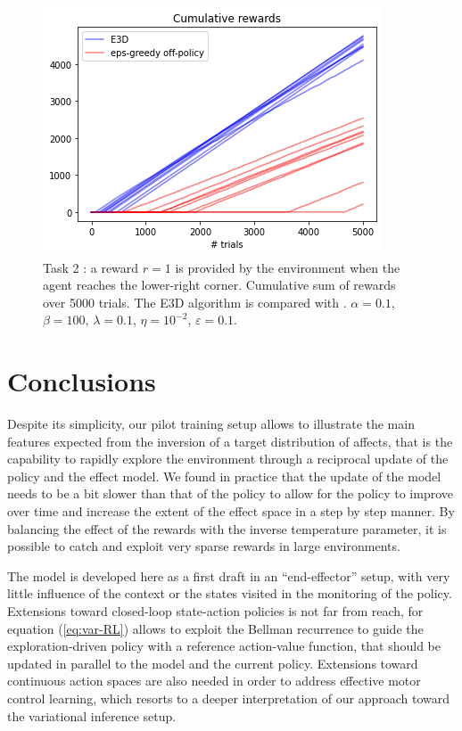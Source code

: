 \documentclass[runningheads]{llncs}
\begin{document}
\begin{figure}[t!]\label{fig:compare}

	\centerline{
		\includegraphics[width = .7\linewidth]{../figures/training-comparison.png} 		
	}
	\caption{Task 2 : a reward $r=1$ is provided by the environment when the agent reaches the lower-right corner. Cumulative sum of rewards over 5000 trials. The E3D algorithm is compared with . $\alpha=0.1$, $\beta = 100$, $\lambda=0.1$, $\eta=10^{-2}$, $\varepsilon=0.1$.}
\end{figure}

\section{Conclusions}

Despite its simplicity, our pilot training setup allows to illustrate the main features expected from the inversion of a target distribution of affects, that is the capability to rapidly explore the environment through a reciprocal update of the policy and the effect model. We found in practice that the update of the model needs to be a bit slower than that of the policy to allow for the policy to improve over time and increase the extent of the effect space in a step by step manner. By balancing the effect of the rewards with the inverse temperature parameter, it is possible to catch and exploit very sparse rewards in large environments. 

The model is developed here as a first draft in an ``end-effector'' setup, with very little influence of the context or the states visited in the monitoring of the policy. Extensions toward closed-loop state-action policies is not far from reach, for equation (\ref{eq:var-RL}) allows to exploit the Bellman recurrence to guide the exploration-driven policy with a reference action-value function, that should be updated in parallel to the model and the current policy. Extensions toward continuous action spaces are also needed in order to address effective motor control learning, which resorts to a deeper interpretation of our approach toward the variational inference setup. 
%
%
%


%
\end{document}
